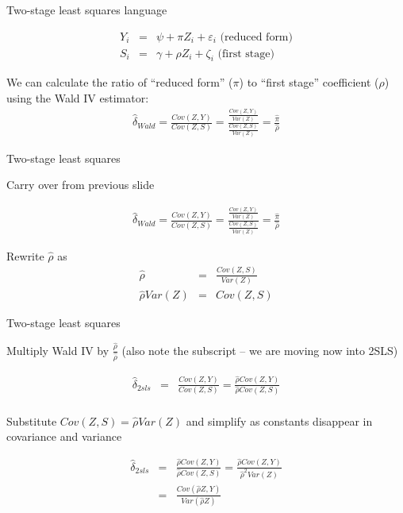 \documentclass{beamer}
\begin{document}
\begin{frame}{Two-stage least squares language}

		\begin{eqnarray*}
		Y_i&=&\psi + \pi{Z_i} + \varepsilon_i \text{ (reduced form)} \\
		S_i &=& \gamma + \rho{Z}_i + \zeta_i \text{ (first stage)} 
		\end{eqnarray*}
		
		\bigskip
		
We can calculate the ratio of ``reduced form'' ($\pi$) to ``first stage'' coefficient ($\rho$) using the Wald IV estimator:
		\begin{eqnarray*}
		\widehat{\delta}_{Wald} = \frac{ Cov(Z,Y)} {Cov(Z,S)} = \frac{ \frac{Cov(Z,Y)}{Var(Z)}}{ \frac{Cov(Z,S)}{Var(Z)}} = \frac{\widehat{\pi}}{\widehat{\rho}}
		\end{eqnarray*}

\end{frame}



\begin{frame}{Two-stage least squares}

Carry over from previous slide

\bigskip

		\begin{eqnarray*}
		\widehat{\delta}_{Wald} = \frac{ Cov(Z,Y)} {Cov(Z,S)} = \frac{ \frac{Cov(Z,Y)}{Var(Z)}}{ \frac{Cov(Z,S)}{Var(Z)}} = \frac{\widehat{\pi}}{\widehat{\rho}}
		\end{eqnarray*}

\bigskip

Rewrite $\widehat{\rho}$ as\begin{eqnarray*}
	\widehat{\rho} &=&  \frac{Cov(Z,S)}{Var(Z)} \\
\widehat{\rho}Var(Z)	&=& Cov(Z,S) 
	\end{eqnarray*}

\end{frame}


\begin{frame}{Two-stage least squares}

Multiply Wald IV by $\frac{\widehat{\rho}}{\widehat{\rho}}$  (also note the subscript -- we are moving now into 2SLS)

	\begin{eqnarray*}
	\widehat{\delta}_{2sls} &=& \frac{ Cov(Z,Y)}{ Cov(Z,S)} = \frac{\widehat{\rho}Cov(Z,Y)}{\widehat{\rho}Cov(Z,S)} \\
	\end{eqnarray*}

Substitute $Cov(Z,S) = \widehat{\rho}Var(Z) $ and simplify as constants disappear in covariance and variance

	\begin{eqnarray*}
	\widehat{\delta}_{2sls} &=& \frac{\widehat{\rho}Cov(Z,Y)}{\widehat{\rho}Cov(Z,S)} = \frac{\widehat{\rho}Cov(Z,Y)}{\widehat{\rho}^2Var(Z)}  \\
	&=&\frac{Cov(\widehat{\rho}Z,Y)}{Var(\widehat{\rho}Z)} 
	\end{eqnarray*}

\end{frame}
\end{document}
